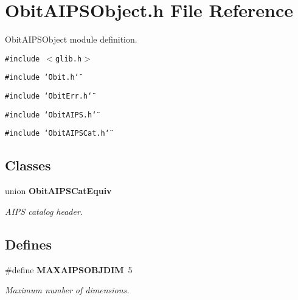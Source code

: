 \section{Obit\-AIPSObject.h File Reference}
\label{ObitAIPSObject_8h}
Obit\-AIPSObject module definition. 

{\tt \#include $<$glib.h$>$}\par
{\tt \#include \char`\"{}Obit.h\char`\"{}}\par
{\tt \#include \char`\"{}Obit\-Err.h\char`\"{}}\par
{\tt \#include \char`\"{}Obit\-AIPS.h\char`\"{}}\par
{\tt \#include \char`\"{}Obit\-AIPSCat.h\char`\"{}}\par
\subsection*{Classes}
\begin{CompactItemize}
\item 
union {\bf Obit\-AIPSCat\-Equiv}
\begin{CompactList}\small\item\em AIPS catalog header. \item\end{CompactList}\end{CompactItemize}
\subsection*{Defines}
\begin{CompactItemize}
\item 
\#define {\bf MAXAIPSOBJDIM}\ 5
\begin{CompactList}\small\item\em Maximum number of dimensions. \item\end{CompactList}\end{CompactItemize}
